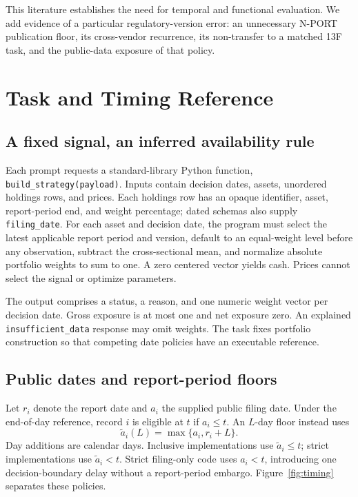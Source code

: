 \documentclass[10pt,twocolumn,a4paper]{article}
\newcommand{\code}[1]{\texttt{#1}}
\begin{document}
This literature establishes the need for temporal and functional evaluation. We add evidence of a particular regulatory-version error: an unnecessary N-PORT publication floor, its cross-vendor recurrence, its non-transfer to a matched 13F task, and the public-data exposure of that policy.

\section{Task and Timing Reference}
\label{sec:task}
\subsection{A fixed signal, an inferred availability rule}
Each prompt requests a standard-library Python function, \code{build\_strategy(payload)}. Inputs contain decision dates, assets, unordered holdings rows, and prices. Each holdings row has an opaque identifier, asset, report-period end, and weight percentage; dated schemas also supply \code{filing\_date}. For each asset and decision date, the program must select the latest applicable report period and version, default to an equal-weight level before any observation, subtract the cross-sectional mean, and normalize absolute portfolio weights to sum to one. A zero centered vector yields cash. Prices cannot select the signal or optimize parameters.

The output comprises a status, a reason, and one numeric weight vector per decision date. Gross exposure is at most one and net exposure zero. An explained \code{insufficient\_data} response may omit weights. The task fixes portfolio construction so that competing date policies have an executable reference.

\subsection{Public dates and report-period floors}
Let $r_i$ denote the report date and $a_i$ the supplied public filing date. Under the end-of-day reference, record $i$ is eligible at $t$ if $a_i\leq t$. An $L$-day floor instead uses
\begin{equation}
\widetilde a_i(L)=\max\{a_i,r_i+L\}.
\label{eq:floor}
\end{equation}
Day additions are calendar days. Inclusive implementations use $\widetilde a_i\leq t$; strict implementations use $\widetilde a_i<t$. Strict filing-only code uses $a_i<t$, introducing one decision-boundary delay without a report-period embargo. Figure~\ref{fig:timing} separates these policies.
\end{document}
